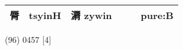 \documentclass[14pt,a4paper]{scrartcl}
\begin{document}
\begin{longtable}[c]{@{}llllll@{}}
\begin{minipage}[t]{0.14\columnwidth}
脣
\strut\end{minipage} &
\begin{minipage}[t]{0.14\columnwidth}\raggedright\strut
tsyinH
\strut\end{minipage} &
\begin{minipage}[t]{0.14\columnwidth}\raggedright\strut
漘 zywin
\strut\end{minipage} &
\begin{minipage}[t]{0.14\columnwidth}\raggedright\strut
\strut\end{minipage} &
\begin{minipage}[t]{0.14\columnwidth}\raggedright\strut
\strut\end{minipage} &
\begin{minipage}[t]{0.14\columnwidth}\raggedright\strut
pure:B
\strut\end{minipage}\tabularnewline
\bottomrule
\end{longtable}

(96) 0457 {[}4{]}
\end{document}
